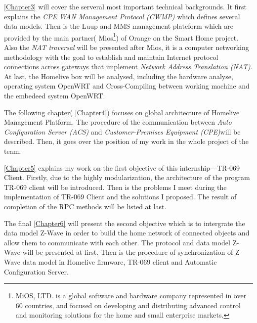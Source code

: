 \autoref{Chapter3} will cover the serveral most important technical backgrounds. It first explains the \textit{CPE WAN Management Protocol (CWMP)} which defines several data models. Then is the Luup and MMS management plateform which are provided by the main partner( Mios\footnote{MiOS, LTD. is a global software and hardware company represented in over 60 countries, and focused on developing and distributing advanced control and monitoring solutions for the home and small enterprise markets.}) of Orange on the Smart Home project. Also the \textit{NAT traversal} will be presented after Mios, it is a computer networking methodology with the goal to establish and maintain Internet protocol connections across gateways that implement \textit{Network Address Translation (NAT)}. At last, the Homelive box will be analysed, including the hardware analyse, operating system OpenWRT and Cross-Compiling between working machine and the embedeed system OpenWRT.

The following chapter( \autoref{Chapter4}) focuses on global architecture of Homelive Management Platform. The procedure of the communication between \textit{Auto Configuration Server (ACS)} and \textit{Customer-Premises Equipment (CPE)}will be described. Then, it goes over the position of my work in the whole project of the team.

\autoref{Chapter5} explains my work on the first objective of this internship---TR-069 Client. Firstly, due to the highly modularization, the architecture of the program TR-069 client will be introduced. Then is the problems I meet during the implementation of TR-069 Client and the solutions I proposed. The result of completion of the RPC methods will be listed at last.

The final \autoref{Chapter6} will present the second objective which is to intergrate the data model Z-Wave in order to build the home network of connected objects and allow them to communicate with each other. The protocol and data model Z-Wave will be presented at first. Then is the procedure of synchronization of Z-Wave data model in Homelive firmware, TR-069 client and Automatic Configuration Server.
